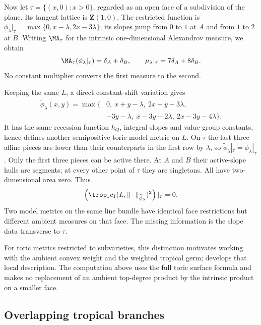 \begin{example}
Now let $\tau=\{(x,0):x>0\}$, regarded as an open face of a subdivision
of the plane.  Its tangent lattice is $\mathbf Z(1,0)$.
The restricted function is
$\phi_\lambda|_\tau=\max\{0,x-\lambda,2x-3\lambda\}$;
its slopes jump from $0$ to $1$ at $A$ and from $1$ to $2$ at $B$.
Writing $\MA_\tau$ for the intrinsic one-dimensional Alexandrov measure,
we obtain
\begin{equation}
\label{eq:ch19-lower-face-intrinsic-measure}
 \MA_\tau(\phi_\lambda|_\tau)=\delta_A+\delta_B,
 \qquad \mu_\lambda|_\tau=7\delta_A+8\delta_B.
\end{equation}
No constant multiplier converts the first measure to the second.

Keeping the same $L$, a direct constant-shift variation gives
\begin{equation}
\label{eq:ch19-lower-face-second-weight}
\begin{aligned}
 \widetilde\phi_\lambda(x,y)=\max\{&0,\ x+y-\lambda,\ 2x+y-3\lambda,\\
                         &-3y-\lambda,\ x-3y-2\lambda,\
                           2x-3y-4\lambda\}.
\end{aligned}
\end{equation}
It has the same recession function $h_Q$, integral slopes and value-group
constants, hence defines another semipositive toric model metric on $L$.
On $\tau$ the last three affine pieces are lower than their counterparts
in the first row by $\lambda$, so
$\widetilde\phi_\lambda|_\tau=\phi_\lambda|_\tau$.
Only the first three pieces can be active there.  At $A$ and $B$ their
active-slope hulls are segments; at every other point of $\tau$ they are
singletons.  All have two-dimensional area zero.  Thus
\[
 \left(\trop_*c_1(L,\|\cdot\|_{\widetilde\phi_\lambda})^2\right)|_\tau=0.
\]
Two model metrics on the same line bundle have identical face restrictions
but different ambient measures on that face.  The missing information is
the slope data transverse to $\tau$.
\end{example}

For toric metrics restricted to subvarieties, this distinction motivates
working with the ambient convex weight and the weighted tropical germ;
\cite[\S\S9--10]{Lin26} develops that local description.  The computation
above uses the full toric surface formula and makes no replacement of an
ambient top-degree product by the intrinsic product on a smaller face.

\subsection{Overlapping tropical branches}
\label{sec:ch19-toric-overlapping-branches}

